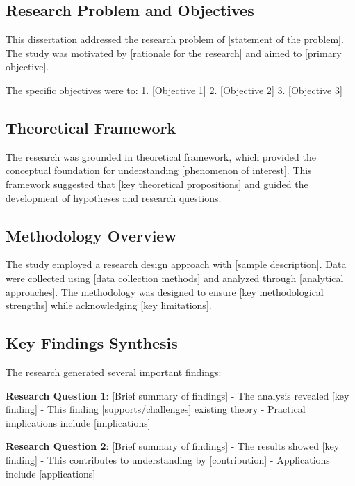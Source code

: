 \documentclass[
  12pt,
  letterpaper,
  12pt,
  letterpaper,
  oneside]{report}
\begin{document}
\subsection{Research Problem and
Objectives}\label{research-problem-and-objectives}

This dissertation addressed the research problem of {[}statement of the
problem{]}. The study was motivated by {[}rationale for the research{]}
and aimed to {[}primary objective{]}.

The specific objectives were to: 1. {[}Objective 1{]} 2. {[}Objective
2{]} 3. {[}Objective 3{]}

\subsection{Theoretical Framework}\label{theoretical-framework-1}

The research was grounded in
\hyperref[theoretical-framework]{theoretical framework}, which provided
the conceptual foundation for understanding {[}phenomenon of
interest{]}. This framework suggested that {[}key theoretical
propositions{]} and guided the development of hypotheses and research
questions.

\subsection{Methodology Overview}\label{methodology-overview}

The study employed a \hyperref[research-design]{research design}
approach with {[}sample description{]}. Data were collected using
{[}data collection methods{]} and analyzed through {[}analytical
approaches{]}. The methodology was designed to ensure {[}key
methodological strengths{]} while acknowledging {[}key limitations{]}.

\subsection{Key Findings Synthesis}\label{key-findings-synthesis}

The research generated several important findings:

\textbf{Research Question 1}: {[}Brief summary of findings{]} - The
analysis revealed {[}key finding{]} - This finding
{[}supports/challenges{]} existing theory - Practical implications
include {[}implications{]}

\textbf{Research Question 2}: {[}Brief summary of findings{]} - The
results showed {[}key finding{]} - This contributes to understanding by
{[}contribution{]} - Applications include {[}applications{]}
\end{document}
